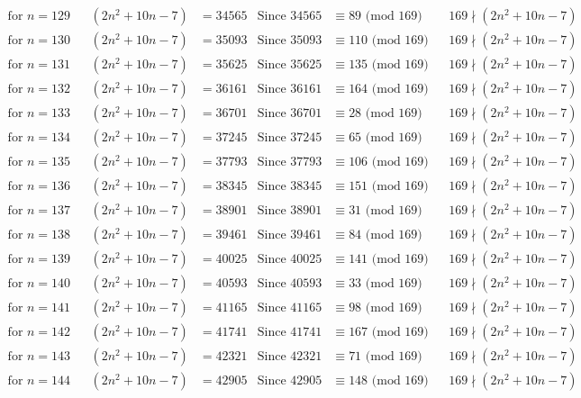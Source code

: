 \documentclass[12pt]{article}
\begin{document}
\begin{align*}
\text{for $n = 129 $}&& (2n^2+10n-7) &= 34565 & \text{Since } 34565  &\equiv  89 \text{ (mod $169$)}&& 169 \nmid (2n^2+10n-7)\\
\text{for $n = 130 $}&& (2n^2+10n-7) &= 35093 & \text{Since } 35093  &\equiv  110 \text{ (mod $169$)}&& 169 \nmid (2n^2+10n-7)\\
\text{for $n = 131 $}&& (2n^2+10n-7) &= 35625 & \text{Since } 35625  &\equiv  135 \text{ (mod $169$)}&& 169 \nmid (2n^2+10n-7)\\
\text{for $n = 132 $}&& (2n^2+10n-7) &= 36161 & \text{Since } 36161  &\equiv  164 \text{ (mod $169$)}&& 169 \nmid (2n^2+10n-7)\\
\text{for $n = 133 $}&& (2n^2+10n-7) &= 36701 & \text{Since } 36701  &\equiv  28 \text{ (mod $169$)}&& 169 \nmid (2n^2+10n-7)\\
\text{for $n = 134 $}&& (2n^2+10n-7) &= 37245 & \text{Since } 37245  &\equiv  65 \text{ (mod $169$)}&& 169 \nmid (2n^2+10n-7)\\
\text{for $n = 135 $}&& (2n^2+10n-7) &= 37793 & \text{Since } 37793  &\equiv  106 \text{ (mod $169$)}&& 169 \nmid (2n^2+10n-7)\\
\text{for $n = 136 $}&& (2n^2+10n-7) &= 38345 & \text{Since } 38345  &\equiv  151 \text{ (mod $169$)}&& 169 \nmid (2n^2+10n-7)\\
\text{for $n = 137 $}&& (2n^2+10n-7) &= 38901 & \text{Since } 38901  &\equiv  31 \text{ (mod $169$)}&& 169 \nmid (2n^2+10n-7)\\
\text{for $n = 138 $}&& (2n^2+10n-7) &= 39461 & \text{Since } 39461  &\equiv  84 \text{ (mod $169$)}&& 169 \nmid (2n^2+10n-7)\\
\text{for $n = 139 $}&& (2n^2+10n-7) &= 40025 & \text{Since } 40025  &\equiv  141 \text{ (mod $169$)}&& 169 \nmid (2n^2+10n-7)\\
\text{for $n = 140 $}&& (2n^2+10n-7) &= 40593 & \text{Since } 40593  &\equiv  33 \text{ (mod $169$)}&& 169 \nmid (2n^2+10n-7)\\
\text{for $n = 141 $}&& (2n^2+10n-7) &= 41165 & \text{Since } 41165  &\equiv  98 \text{ (mod $169$)}&& 169 \nmid (2n^2+10n-7)\\
\text{for $n = 142 $}&& (2n^2+10n-7) &= 41741 & \text{Since } 41741  &\equiv  167 \text{ (mod $169$)}&& 169 \nmid (2n^2+10n-7)\\
\text{for $n = 143 $}&& (2n^2+10n-7) &= 42321 & \text{Since } 42321  &\equiv  71 \text{ (mod $169$)}&& 169 \nmid (2n^2+10n-7)\\
\text{for $n = 144 $}&& (2n^2+10n-7) &= 42905 & \text{Since } 42905  &\equiv  148 \text{ (mod $169$)}&& 169 \nmid (2n^2+10n-7)\\

\end{align*}
\end{document}
